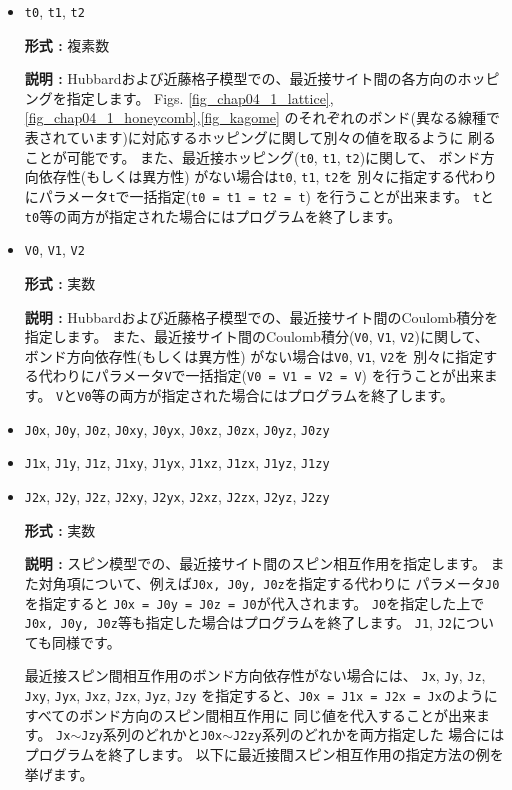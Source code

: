 \begin{itemize}
\item \verb|t0|,  \verb|t1|, \verb|t2|

{\bf 形式 :} 複素数

{\bf 説明 :} Hubbardおよび近藤格子模型での、最近接サイト間の各方向のホッピングを指定します。
Figs. \ref{fig_chap04_1_lattice}, \ref{fig_chap04_1_honeycomb},\ref{fig_kagome}
のそれぞれのボンド(異なる線種で表されています)に対応するホッピングに関して別々の値を取るように
刷ることが可能です。
また、最近接ホッピング(\verb|t0|,  \verb|t1|, \verb|t2|)に関して、
ボンド方向依存性(もしくは異方性)
がない場合は\verb|t0|,  \verb|t1|, \verb|t2|を
別々に指定する代わりにパラメータ\verb|t|で一括指定(\verb|t0 = t1 = t2 = t|)
を行うことが出来ます。
\verb|t|と\verb|t0|等の両方が指定された場合にはプログラムを終了します。

\item \verb|V0|,  \verb|V1|, \verb|V2|

{\bf 形式 :} 実数

{\bf 説明 :} Hubbardおよび近藤格子模型での、最近接サイト間のCoulomb積分を指定します。
また、最近接サイト間のCoulomb積分(\verb|V0|,  \verb|V1|, \verb|V2|)に関して、
ボンド方向依存性(もしくは異方性)
がない場合は\verb|V0|,  \verb|V1|, \verb|V2|を
別々に指定する代わりにパラメータ\verb|V|で一括指定(\verb|V0 = V1 = V2 = V|)
を行うことが出来ます。
\verb|V|と\verb|V0|等の両方が指定された場合にはプログラムを終了します。

\item \verb|J0x|, \verb|J0y|, \verb|J0z|, \verb|J0xy|, 
  \verb|J0yx|, \verb|J0xz|, \verb|J0zx|, \verb|J0yz|, \verb|J0zy|
\item \verb|J1x|, \verb|J1y|, \verb|J1z|, \verb|J1xy|, 
  \verb|J1yx|, \verb|J1xz|, \verb|J1zx|, \verb|J1yz|, \verb|J1zy|
\item \verb|J2x|, \verb|J2y|, \verb|J2z|, \verb|J2xy|, 
  \verb|J2yx|, \verb|J2xz|, \verb|J2zx|, \verb|J2yz|, \verb|J2zy|

{\bf 形式 :} 実数

{\bf 説明 :} スピン模型での、最近接サイト間のスピン相互作用を指定します。
また対角項について、例えば\verb|J0x, J0y, J0z|を指定する代わりに
パラメータ\verb|J0|を指定すると
\verb|J0x = J0y = J0z = J0|が代入されます。
\verb|J0|を指定した上で\verb|J0x, J0y, J0z|等も指定した場合はプログラムを終了します。
\verb|J1|, \verb|J2|についても同様です。

最近接スピン間相互作用のボンド方向依存性がない場合には、
\verb|Jx|, \verb|Jy|, \verb|Jz|, \verb|Jxy|, 
\verb|Jyx|, \verb|Jxz|, \verb|Jzx|, \verb|Jyz|, \verb|Jzy|
を指定すると、\verb|J0x = J1x = J2x = Jx|のようにすべてのボンド方向のスピン間相互作用に
同じ値を代入することが出来ます。
\verb|Jx|$\sim$\verb|Jzy|系列のどれかと\verb|J0x|$\sim$\verb|J2zy|系列のどれかを両方指定した
場合にはプログラムを終了します。
以下に最近接間スピン相互作用の指定方法の例を挙げます。


\end{itemize}
